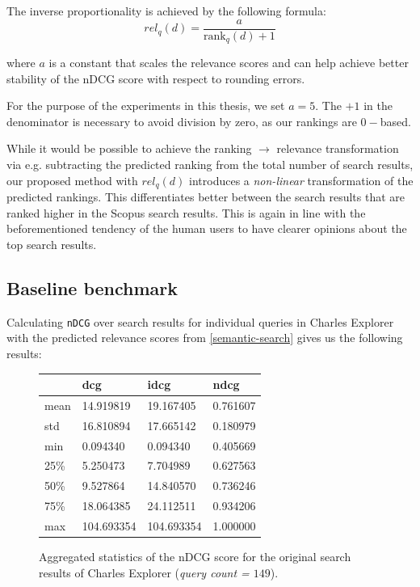 The inverse proportionality is achieved by the following formula:
\[rel_q(d) = \frac{a}{\text{rank}_q(d) + 1}\]

where $a$ is a constant that scales the relevance scores and can help achieve better 
stability of the nDCG score with respect to rounding errors.

For the purpose of the experiments in this thesis, we set $a = 5$. 
The $+1$ in the denominator is necessary to avoid division by zero, as our rankings are $0-$based.

While it would be possible to achieve the ranking $\rightarrow$ relevance transformation via e.g. subtracting the predicted ranking from the total number of search results, 
our proposed method with $rel_q(d)$ introduces a \textit{non-linear} transformation of the predicted rankings. 
This differentiates better between the search results that are ranked higher in the Scopus search results. 
This is again in line with the beforementioned tendency of the human users to have clearer opinions about the top search results.

\subsection{Baseline benchmark}\label{baseline-benchmark}

Calculating \texttt{nDCG} over search results for individual queries in
Charles Explorer with the predicted relevance scores from \ref{semantic-search} gives us the following results:

\begin{figure}[!ht]
    \captionsetup{width=.9\linewidth}
    \centering
    \begin{tabular}{|l|l|l|l|}
    \hline
        ~ & dcg & idcg & ndcg \\ \hline
        mean & 14.919819 & 19.167405 & 0.761607 \\ \hline
        std & 16.810894 & 17.665142 & 0.180979 \\ \hline
        min & 0.094340 & 0.094340 & 0.405669 \\ \hline
        25\% & 5.250473 & 7.704989 & 0.627563 \\ \hline
        50\% & 9.527864 & 14.840570 & 0.736246 \\ \hline
        75\% & 18.064385 & 24.112511 & 0.934206 \\ \hline
        max & 104.693354 & 104.693354 & 1.000000 \\ \hline
    \end{tabular}
    \caption{Aggregated statistics of the nDCG score for the original search results of Charles Explorer (\textit{query count = $149$}).}
\end{figure}

